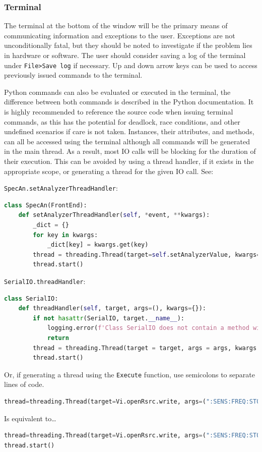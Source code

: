 \documentclass[titlepage]{article}
\begin{document}
\subsubsection{Terminal}
The terminal at the bottom of the window will be the primary means of communicating information and exceptions to the user. Exceptions are not unconditionally fatal, but they should be noted to investigate if the problem lies in hardware or software. The user should consider saving a log of the terminal under \verb|File>Save log| if necessary. Up and down arrow keys can be used to access previously issued commands to the terminal.

Python commands can also be evaluated or executed in the terminal, the difference between both commands is described in the Python documentation. It is highly recommended to reference the source code when issuing terminal commands, as this has the potential for deadlock, race conditions, and other undefined scenarios if care is not taken. Instances, their attributes, and methods, can all be accessed using the terminal although all commands will be generated in the main thread. As a result, most IO calls will be blocking for the duration of their execution. This can be avoided by using a thread handler, if it exists in the appropriate scope, or generating a thread for the given IO call. See:

\verb|SpecAn.setAnalyzerThreadHandler|:
\begin{lstlisting}[language=Python]
class SpecAn(FrontEnd):
    def setAnalyzerThreadHandler(self, *event, **kwargs):
        _dict = {}
        for key in kwargs:
            _dict[key] = kwargs.get(key)
        thread = threading.Thread(target=self.setAnalyzerValue, kwargs=_dict)
        thread.start()
\end{lstlisting}

\verb|SerialIO.threadHandler|:
\begin{lstlisting}[language=Python]
class SerialIO:
    def threadHandler(self, target, args=(), kwargs={}):
        if not hasattr(SerialIO, target.__name__):
            logging.error(f'Class SerialIO does not contain a method with identifier {target.__name__}')
            return
        thread = threading.Thread(target = target, args = args, kwargs = kwargs, daemon=True)
        thread.start()
\end{lstlisting}

Or, if generating a thread using the \verb|Execute| function, use semicolons to separate lines of code.
\begin{lstlisting}[language=Python]
thread=threading.Thread(target=Vi.openRsrc.write, args=(":SENS:FREQ:STOP 10e9",), daemon=True);thread.start()
\end{lstlisting}
Is equivalent to\dots
\begin{lstlisting}[language=Python]
thread=threading.Thread(target=Vi.openRsrc.write, args=(":SENS:FREQ:STOP 10e9",), daemon=True)
thread.start()
\end{lstlisting}  
\end{document}
